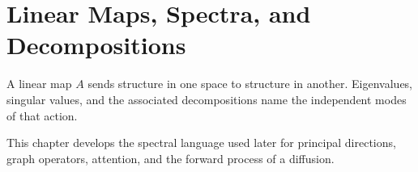 \chapter{Linear Maps, Spectra, and Decompositions}
\label{ch:operators-and-spectra}

A linear map $A$ sends structure in one space to structure in another. Eigenvalues, singular values, and the associated decompositions name the independent modes of that action.

This chapter develops the spectral language used later for principal directions, graph operators, attention, and the forward process of a diffusion.

